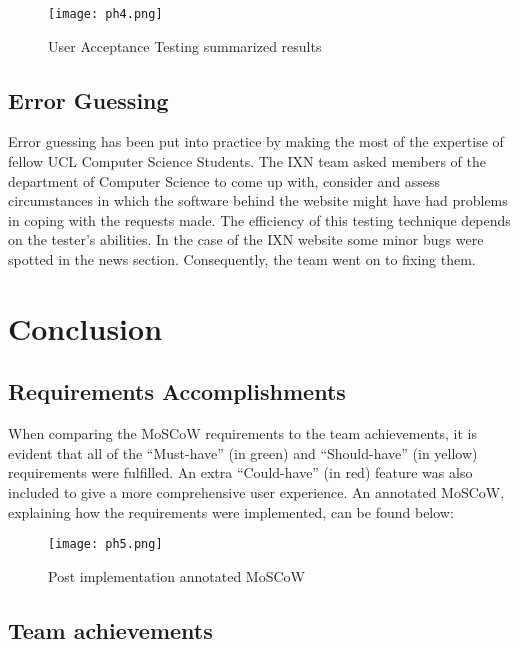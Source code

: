 \begin{figure}[H]
      \centering
      \texttt{[image: ph4.png]}
      \caption{User Acceptance Testing summarized results}
 \end{figure}

\hypertarget{error-guessing}{%
\subsection{Error Guessing}\label{error-guessing}}

Error guessing has been put into practice by making the most of the
expertise of fellow UCL Computer Science Students. The IXN team asked
members of the department of Computer Science to come up with, consider
and assess circumstances in which the software behind the website might
have had problems in coping with the requests made. The efficiency of
this testing technique depends on the tester's abilities. In the case of
the IXN website some minor bugs were spotted in the news section.
Consequently, the team went on to fixing them.

\hypertarget{conclusion}{%
\section{Conclusion}\label{conclusion}}

\hypertarget{requirements-accomplishments}{%
\subsection{Requirements
Accomplishments}\label{requirements-accomplishments}}

When comparing the MoSCoW requirements to the team achievements, it is
evident that all of the ``Must-have'' (in green) and ``Should-have'' (in
yellow) requirements were fulfilled. An extra ``Could-have'' (in red)
feature was also included to give a more comprehensive user experience.
An annotated MoSCoW, explaining how the requirements were implemented,
can be found below:

\begin{figure}[H]
      \centering
      \texttt{[image: ph5.png]}
      \caption{Post implementation annotated MoSCoW}
 \end{figure}

\hypertarget{team-achievements}{%
\subsection{Team achievements}\label{team-achievements}}

